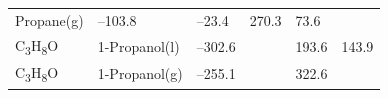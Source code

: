 \documentclass[
]{book}
\theoremstyle{definition}
\theoremstyle{definition}
\theoremstyle{definition}
\theoremstyle{remark}
\begin{document}
\begin{longtable}[]{@{}llllll@{}}
\begin{minipage}[t]{0.17\columnwidth}
Propane(g)\strut
\end{minipage} & \begin{minipage}[t]{0.15\columnwidth}\raggedright
--103.8\strut
\end{minipage} & \begin{minipage}[t]{0.15\columnwidth}\raggedright
--23.4\strut
\end{minipage} & \begin{minipage}[t]{0.14\columnwidth}\raggedright
270.3\strut
\end{minipage} & \begin{minipage}[t]{0.14\columnwidth}\raggedright
73.6\strut
\end{minipage}\tabularnewline
\begin{minipage}[t]{0.07\columnwidth}\raggedright
C\textsubscript{3}H\textsubscript{8}O\strut
\end{minipage} & \begin{minipage}[t]{0.17\columnwidth}\raggedright
1-Propanol(l)\strut
\end{minipage} & \begin{minipage}[t]{0.15\columnwidth}\raggedright
--302.6\strut
\end{minipage} & \begin{minipage}[t]{0.15\columnwidth}\raggedright
\strut
\end{minipage} & \begin{minipage}[t]{0.14\columnwidth}\raggedright
193.6\strut
\end{minipage} & \begin{minipage}[t]{0.14\columnwidth}\raggedright
143.9\strut
\end{minipage}\tabularnewline
\begin{minipage}[t]{0.07\columnwidth}\raggedright
C\textsubscript{3}H\textsubscript{8}O\strut
\end{minipage} & \begin{minipage}[t]{0.17\columnwidth}\raggedright
1-Propanol(g)\strut
\end{minipage} & \begin{minipage}[t]{0.15\columnwidth}\raggedright
--255.1\strut
\end{minipage} & \begin{minipage}[t]{0.15\columnwidth}\raggedright
\strut
\end{minipage} & \begin{minipage}[t]{0.14\columnwidth}\raggedright
322.6\strut
\end{minipage} & \begin{minipage}[t]{0.14\columnwidth}\raggedright

\end{minipage}
\end{longtable}
\end{document}
